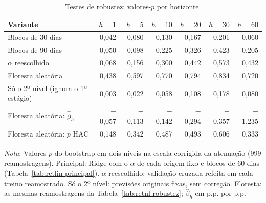 \begin{table}[H]
\centering
\small
\caption{Testes de robustez: valores-$p$ por horizonte.}
\label{tab:retlin-robustez}
\begin{tabular}{lrrrrrr}
\toprule
Variante & $h = 1$ & $h = 5$ & $h = 10$ & $h = 20$ & $h = 30$ & $h = 60$ \\
\midrule
Blocos de 30 dias & 0{,}042 & 0{,}080 & 0{,}130 & 0{,}167 & 0{,}201 & 0{,}060 \\
Blocos de 90 dias & 0{,}050 & 0{,}098 & 0{,}225 & 0{,}326 & 0{,}423 & 0{,}205 \\
$\alpha$ reescolhido & 0{,}068 & 0{,}156 & 0{,}300 & 0{,}442 & 0{,}573 & 0{,}432 \\
Floresta aleatória & 0{,}438 & 0{,}597 & 0{,}770 & 0{,}794 & 0{,}834 & 0{,}720 \\
Só o 2º nível (ignora o 1º estágio) & 0{,}003 & 0{,}022 & 0{,}058 & 0{,}108 & 0{,}178 & 0{,}080 \\
\addlinespace
Floresta aleatória: $\hat\beta_h$ & $-$0{,}057 & $-$0{,}113 & $-$0{,}142 & $-$0{,}294 & $-$0{,}357 & $-$1{,}235 \\
Floresta aleatória: $p$ HAC & 0{,}148 & 0{,}342 & 0{,}487 & 0{,}493 & 0{,}606 & 0{,}333 \\
\bottomrule
\end{tabular}
\par\smallskip
\parbox{0.95\linewidth}{\footnotesize\textit{Nota}: Valores-$p$ do bootstrap em dois níveis na escala corrigida da atenuação (999 reamostragens). Principal: Ridge com o $\alpha$ de cada origem fixo e blocos de 60 dias (Tabela~\ref{tab:retlin-principal}). $\alpha$ reescolhido: validação cruzada refeita em cada treino reamostrado. Só o 2º nível: previsões originais fixas, sem correção. Floresta: as mesmas reamostragens da Tabela~\ref{tab:retnl-robustez}; $\hat\beta_h$ em p.p. por p.p.}
\end{table}
